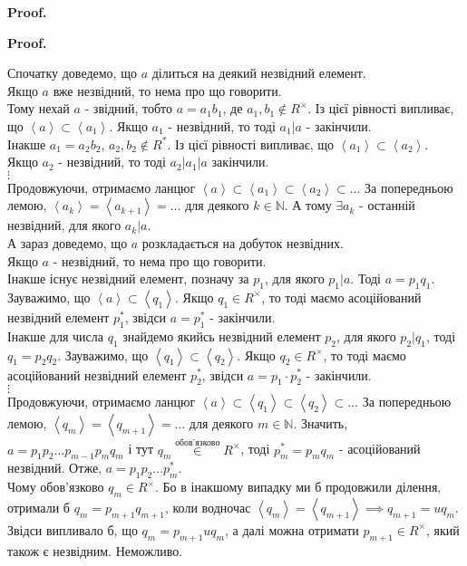 \documentclass[a4paper, 14pt]{extarticle}
\makeatletter
\theoremstyle{theoremdd}
\theoremstyle{theoremdd}
\theoremstyle{theoremdd}
\theoremstyle{theoremdd}
\theoremstyle{theoremdd}
\theoremstyle{theoremdd}
\theoremstyle{theoremdd}
\theoremstyle{theoremdd}
\def\qed{$\blacksquare$}
\renewenvironment{proof}[1][Proof.\\]{\par
\pushQED{\hfill \qed}%
\normalfont \topsep6\p@\@plus6\p@\relax
\trivlist
\item\relax
{\bfseries
#1\@addpunct{.}}\hspace\labelsep\ignorespaces
}{%
\popQED\endtrivlist\@endpefalse
}
\makeatother
\begin{document}
\begin{proof}
\begin{proof}
Спочатку доведемо, що $a$ ділиться на деякий незвідний елемент.\\
Якщо $a$ вже незвідний, то нема про що говорити.\\
Тому нехай $a$ - звідний, тобто $a = a_1b_1$, де $a_1,b_1 \not \in R^\times$. Із цієї рівності випливає, що $\left<a  \right> \subset \left< a_1 \right>$. Якщо $a_1$ - незвідний, то тоді $a_1 | a$ - закінчили.\\
Інакше $a_1 = a_2b_2$, $a_2,b_2 \not\in R^*$. Із цієї рівності випливає, що $\left<a_1 \right> \subset \left< a_2 \right>$.\\
Якщо $a_2$ - незвідний, то тоді $a_2 | a_1 | a$ закінчили.\\
$\vdots$\\
Продовжуючи, отримаємо ланцюг $\left< a \right> \subset \left< a_1 \right> \subset \left< a_2 \right> \subset \dots$ За попередньою лемою, $\left< a_k \right> = \left< a_{k+1} \right> = \dots$ для деякого $k \in \mathbb{N}$. А тому $\exists a_k$ - останній незвідний, для якого $a_k | a$.
\bigskip \\
А зараз доведемо, що $a$ розкладається на добуток незвідних.\\
Якщо $a$ - незвідний, то нема про що говорити.\\
Інакше існує незвідний елемент, позначу за $p_1$, для якого $p_1 | a$. Тоді $a = p_1 q_1$. Зауважимо, що $\left< a \right> \subset \left< q_1\right>$. Якщо $q_1 \in R^\times$, то тоді маємо асоційований незвідний елемент $p_1^*$, звідси $a = p_1^*$ - закінчили.\\
Інакше для числа $q_1$ знайдемо якийсь незвідний елемент $p_2$, для якого $p_2 | q_1$, тоді $q_1 = p_2 q_2$. Зауважимо, що $\left< q_1 \right> \subset \left< q_2 \right>$. Якщо $q_2 \in R^\times$, то тоді маємо асоційований незвідний елемент $p_2^*$, звідси $a = p_1 \cdot p_2^*$ - закінчили.\\
$\vdots$\\
Продовжуючи, отримаємо ланцюг $\left< a \right> \subset \left< q_1 \right> \subset \left< q_2 \right> \subset \dots$ За попередньою лемою, $\left< q_m \right> = \left< q_{m+1} \right> = \dots$ для деякого $m \in \mathbb{N}$. Значить, $a = p_1 p_2 \dots p_{m-1}p_mq_m$ і тут $q_m \overset{\text{обов'язково}}{\in} R^\times$, тоді $p_m^* = p_mq_m$ - асоційований незвідний. Отже, $a = p_1p_2\dots p_m^*$.\\
Чому обов'язково $q_m \in R^\times$. Бо в інакшому випадку ми б продовжили ділення, отримали б $q_m = p_{m+1}q_{m+1}$, коли водночас $\left< q_m \right> = \left< q_{m+1} \right> \implies q_{m+1} = uq_m$. Звідси випливало б, що $q_m = p_{m+1}uq_m$, а далі можна отримати $p_{m+1} \in R^\times$, який також є незвідним. Неможливо.
\end{proof}


\end{proof}
\end{document}
